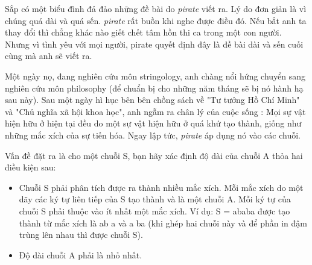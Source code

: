 Sắp có một biểu đình đả đảo những đề bài do       \textit{     pirate    }      viết ra. Lý do đơn giản là vì chúng quá dài và quá sến.   \textit{    pirate   }   rất buồn khi nghe được điều đó. Nếu bắt anh ta thay đổi thì chẳng khác nào giết chết tâm hồn thi ca trong một con người. Nhưng vì tình yêu với mọi người, pirate quyết định đây là đề bài dài và sến cuối cùng mà anh sẽ viết ra.  

   Một ngày nọ, đang nghiên cứu môn stringology, anh chàng nổi hứng chuyển sang nghiên cứu môn philosophy (để chuẩn bị cho những năm tháng sẽ bị nó hành hạ sau này). Sau một ngày hì hục bên bên chồng sách về "Tư tưởng Hồ Chí Minh" và "Chủ nghĩa xã hội khoa học", anh ngẫm ra chân lý của cuộc sống : Mọi sự vật hiện hữu ở hiện tại đều do một sự vật hiện hữu ở quá khứ tạo thành, giống như những mắc xích của sự tiến hóa. Ngay lập tức,   \textit{    pirate   }   áp dụng nó vào các chuỗi.  

   Vấn đề đặt ra là cho một chuỗi S, bạn hãy xác định độ dài của chuỗi A thỏa hai điều kiện sau:  
\begin{itemize}
	\item     Chuỗi S phải phân tích được ra thành nhiều mắc xích. Mỗi mắc xích do một dãy các ký tự liên tiếp của S tạo thành và là một chuỗi A. Mỗi ký tự của chuỗi S phải thuộc vào ít nhất một mắc xích. Ví dụ: S = ababa được tạo thành từ mắc xích là ab         a        và         a        ba (khi ghép hai chuỗi này và để phần in đậm trùng lên nhau thì được chuỗi S).   
	\item     Độ dài chuỗi A phải là nhỏ nhất.   
\end{itemize}
